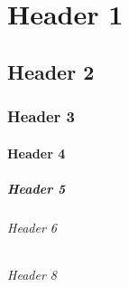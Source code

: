 \chapter{Header 1}


\section{Header 2}


\subsection{Header 3}


\subsubsection{Header 4}


\paragraph{Header 5}


\subparagraph{Header 6}


\subparagraph{Header 8}

